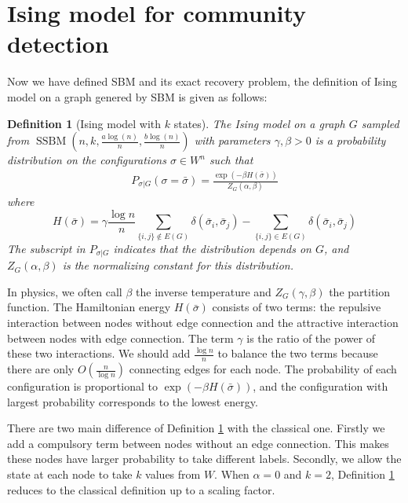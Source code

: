 \documentclass[journal]{IEEEtran}
\newtheorem{definition}{Definition}
\newcommand{\A}{\frac{a \log(n)}{n}}
\newcommand{\B}{\frac{b \log(n)}{n}}
\newcommand{\1}{\mathbbm{1}}
\DeclareMathOperator{\SSBM}{SSBM}
\begin{document}
\section{Ising model for community detection}\label{sec:sibm}
Now we have defined SBM and its exact recovery problem, the definition of Ising model on a graph genered by SBM is given
as follows:
\begin{definition}[Ising model with $k$ states]\label{def:ising}
	The Ising model on a graph $G$ sampled from $\SSBM(n,k,\A,\B)$ with parameters $\gamma,\beta>0$ is a probability distribution on the configurations $\sigma\in W^n$ such that
	\begin{align} \label{eq:isingma}
	P_{\sigma|G}(\sigma=\bar{\sigma})=\frac{\exp(-\beta H(\bar{\sigma}))}{Z_G(\alpha,\beta)}
	\end{align}
	where
	\begin{equation}\label{eq:energy}
	H(\bar{\sigma}) = \gamma \frac{\log n}{n} \sum_{\{i,j\}\not\in E(G)} \delta(\bar{\sigma}_i, \bar{\sigma}_j)
	- \sum_{\{i,j\}\in E(G)} \delta(\bar{\sigma}_i, \bar{\sigma}_j)
	\end{equation}	
	The subscript in $P_{\sigma|G}$ indicates that the distribution depends on $G$, and
	$Z_G(\alpha,\beta)$ is the normalizing constant for this distribution.
\end{definition}
In physics, we often call $\beta$ the inverse temperature and $Z_G(\gamma, \beta)$ the partition function.
The Hamiltonian energy $H(\bar{\sigma})$ consists of two terms: the repulsive interaction between nodes without edge connection
and the attractive interaction between nodes with edge connection. The term $\gamma$ is the ratio of the power of these two
interactions. We should add $\frac{\log n}{n}$ to balance the two terms because there are only $O(\frac{n}{\log n})$
connecting edges for each node.
The probability of each configuration is proportional to $\exp(-\beta H(\bar{\sigma}))$, and the configuration with largest
probability corresponds to the lowest energy.

There are two main difference of Definition \ref{def:ising} with the classical one. Firstly we add a compulsory term
between nodes without an edge connection. This makes these nodes have larger probability to take different labels.
Secondly, we allow the state at each node to take $k$ values from $W$.
When $\alpha = 0$ and $k=2$, Definition \ref{def:ising}
reduces to the classical definition up to a scaling factor.
\end{document}
